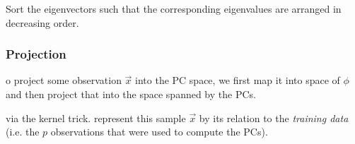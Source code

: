 \begin{frame}{\subsubsecname}

Sort the eigenvectors such that the corresponding eigenvalues are arranged in decreasing order. 


\end{frame}

\subsubsection{Projection}

\begin{frame}{\subsubsecname}
o project some observation $\vec x$ into the PC space, we first map it into space of $\phi$ 
and then project that into the space spanned by the PCs.\\

\pause


 via the kernel trick.
represent this sample $\vec x$ by its relation to the \emph{training data} 
(i.e. the $p$ observations that were used to compute the PCs).

\end{frame}

